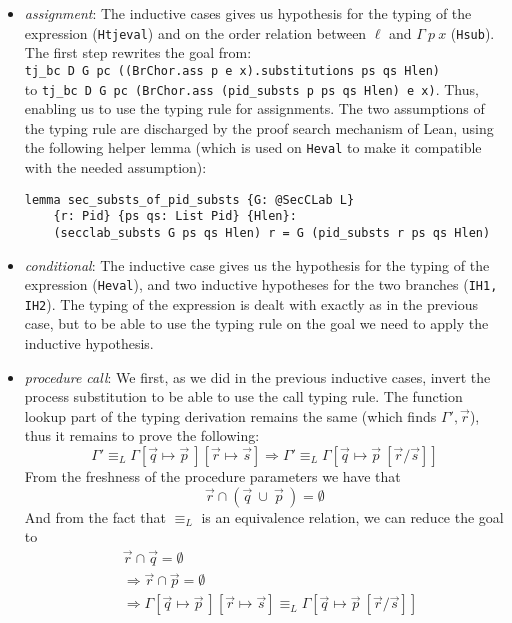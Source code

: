 \documentclass[12pt,a4paper,twoside]{book}
\begin{document}
\begin{itemize}
\item \emph{assignment}: The inductive cases gives us hypothesis for the typing of the expression (\texttt{Htjeval}) and on the order relation between $\ell$ and $\Gamma~p~x$ (\texttt{Hsub}).\\
The first step rewrites the goal from:\\
\texttt{tj\_bc D G pc ((BrChor.ass p e x).substitutions ps qs Hlen)}\\
to \texttt{tj\_bc D G pc (BrChor.ass (pid\_substs p ps qs Hlen) e x)}.
Thus, enabling us to use the typing rule for assignments.
The two assumptions of the typing rule are discharged by the proof search mechanism of Lean, using the following helper lemma (which is used on \texttt{Heval} to make it compatible with the needed assumption):
\begin{verbatim}
lemma sec_substs_of_pid_substs {G: @SecCLab L}
    {r: Pid} {ps qs: List Pid} {Hlen}:
    (secclab_substs G ps qs Hlen) r = G (pid_substs r ps qs Hlen)
\end{verbatim}
\item \emph{conditional}: The inductive case gives us the hypothesis for the typing of the expression (\texttt{Heval}), and two inductive hypotheses for the two branches (\texttt{IH1,  IH2}).
The typing of the expression is dealt with exactly as in the previous case, but to be able to use the typing rule on the goal we need to apply the inductive hypothesis.
\item \emph{procedure call}: We first, as we did in the previous inductive cases, invert the process substitution to be able to use the call typing rule. The function lookup part of the typing derivation remains the same (which finds $\Gamma', \vec{r}$), thus it remains to prove the following:
$$
\Gamma' \equiv_L \Gamma[\vec{q} \mapsto \vec{p}~][\vec{r} \mapsto \vec{s}]
\Longrightarrow 
\Gamma' \equiv_L \Gamma[\vec{q} \mapsto \vec{p}~[\vec{r}/\vec{s}]]
$$
From the freshness of the procedure parameters we have that
$$\vec{r} \cap (\vec{q} ~\cup ~\vec{p}~) = \emptyset$$
And from the fact that $\equiv_L$ is an equivalence relation, we can reduce the goal to
\begin{align*}
&\vec{r} \cap \vec{q} = \emptyset\\
&\Longrightarrow \vec{r} \cap \vec{p} = \emptyset\\
&\Longrightarrow \Gamma[\vec{q} \mapsto \vec{p}~][\vec{r} \mapsto \vec{s}]
\equiv_L \Gamma[\vec{q} \mapsto \vec{p}~[\vec{r}/\vec{s}]]
\end{align*}

\end{itemize}
\end{document}
